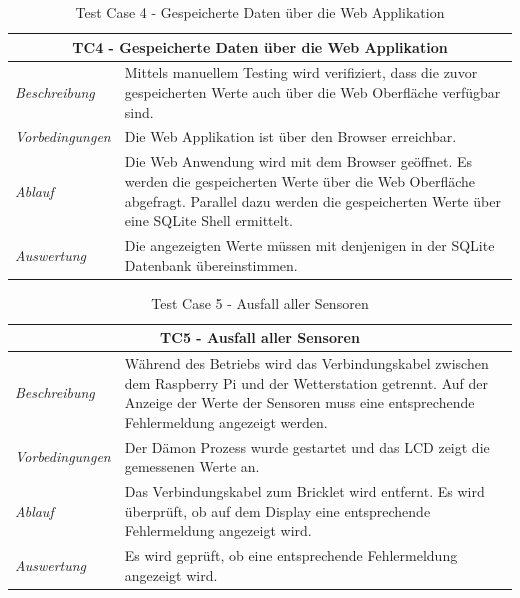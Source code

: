 \documentclass[
    10pt,
    a4paper,
]{scrartcl}
\begin{document}
\begin{table}
    \centering
    \begin{tabularx}{\columnwidth}{lX}
        \multicolumn{2}{c}{\textbf{TC4 - Gespeicherte Daten über die Web Applikation}} \\\toprule
        \textit{Beschreibung} & Mittels manuellem Testing wird verifiziert, dass die zuvor
            gespeicherten Werte auch über die Web Oberfläche verfügbar sind. \\\midrule
        \textit{Vorbedingungen} & Die Web Applikation ist über den Browser erreichbar.
            \\\midrule
        \textit{Ablauf} & Die Web Anwendung wird mit dem Browser geöffnet. Es werden die
            gespeicherten Werte über die Web Oberfläche abgefragt. Parallel dazu werden die
            gespeicherten Werte über eine SQLite Shell ermittelt. \\\midrule
        \textit{Auswertung} & Die angezeigten Werte müssen mit denjenigen in der SQLite
            Datenbank übereinstimmen. \\\bottomrule
    \end{tabularx}
    \caption{Test Case 4 - Gespeicherte Daten über die Web Applikation}
    \label{tab:tc4}
\end{table}

\begin{table}
    \centering
    \begin{tabularx}{\columnwidth}{lX}
        \multicolumn{2}{c}{\textbf{TC5 - Ausfall aller Sensoren}} \\\toprule
        \textit{Beschreibung} & Während des Betriebs wird das Verbindungskabel zwischen
            dem Raspberry Pi und der Wetterstation getrennt. Auf der Anzeige der Werte der
            Sensoren muss eine entsprechende Fehlermeldung angezeigt werden. \\\midrule
        \textit{Vorbedingungen} & Der Dämon Prozess wurde gestartet und das LCD zeigt die
            gemessenen Werte an. \\\midrule
        \textit{Ablauf} & Das Verbindungskabel zum Bricklet wird entfernt. Es wird
            überprüft, ob auf dem Display eine entsprechende Fehlermeldung angezeigt wird.
            \\\midrule
        \textit{Auswertung} & Es wird geprüft, ob eine entsprechende Fehlermeldung
            angezeigt wird. \\\bottomrule
    \end{tabularx}
    \caption{Test Case 5 - Ausfall aller Sensoren}
    \label{tab:tc5}
\end{table}
\end{document}
